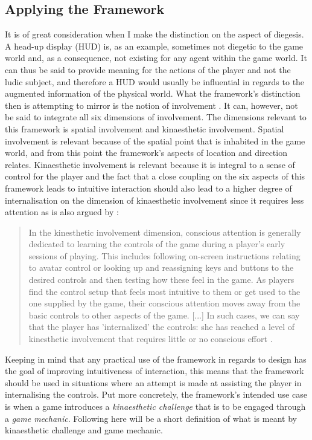 \subsection{Applying the Framework}
It is of great consideration when I make the distinction on the aspect of diegesis. A head-up display (HUD) is, as an example, sometimes not diegetic to the game world and, as a consequence, not existing for any agent within the game world. It can thus be said to provide meaning for the actions of the player and not the ludic subject, and therefore a HUD would usually be influential in regards to the augmented information of the physical world. What the framework's distinction then is attempting to mirror is the notion of involvement . It can, however, not be said to integrate all six dimensions of involvement. The dimensions relevant to this framework is spatial involvement and kinaesthetic involvement. Spatial involvement is relevant because of the spatial point that is inhabited in the game world, and from this point the framework's aspects of location and direction relates. Kinaesthetic involvement is relevant because it is integral to a sense of control for the player and the fact that a close coupling on the six aspects of this framework leads to intuitive interaction \cite{frogger} should also lead to a higher degree of internalisation on the dimension of kinaesthetic involvement since it requires less attention as is also argued by \cite{calleja}:
\begin{quote}
  In the kinesthetic involvement dimension, conscious attention is generally dedicated to learning the controls of the game during a player’s early sessions of playing. This includes following on-screen instructions relating to avatar control or looking up and reassigning keys and buttons to the desired controls and then testing how these feel in the game. As players find the control setup that feels most intuitive to them or get used to the one supplied by the game, their conscious attention moves away from the basic controls to other aspects of the game. [...] In such cases, we can say that the player has 'internalized' the controls: she has reached a level of kinesthetic involvement that requires little or no conscious effort \cite[p. 45]{calleja}.
\end{quote}
Keeping in mind that any practical use of the framework in regards to design has the goal of improving intuitiveness of interaction, this means that the framework should be used in situations where an attempt is made at assisting the player in internalising the controls. Put more concretely, the framework's intended use case is when a game introduces a \textit{kinaesthetic challenge} that is to be engaged through a \textit{game mechanic}. Following here will be a short definition of what is meant by kinaesthetic challenge and game mechanic.

